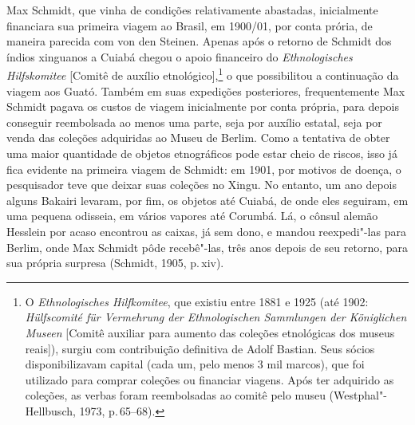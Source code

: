 Max Schmidt, que vinha de condições relativamente abastadas,
inicialmente financiara sua primeira viagem ao Brasil, em 1900/01, por
conta prória, de maneira parecida com von den Steinen. Apenas após o
retorno de Schmidt dos índios xinguanos a Cuiabá chegou o apoio
financeiro do \textit{Ethnologisches Hilfskomitee} {[}Comitê de auxílio
etnológico{]},\footnote{O \textit{Ethnologisches Hilfkomitee}, que existiu
  entre 1881 e 1925 (até 1902: \textit{Hülfscomité für Vermehrung der
  Ethnologischen Sammlungen der Königlichen Museen} {[}Comitê auxiliar
  para aumento das coleções etnológicas dos museus reais{]}), surgiu
  com contribuição definitiva de Adolf Bastian. Seus sócios
  disponibilizavam capital (cada um, pelo menos 3 mil marcos), que foi
  utilizado para comprar coleções ou financiar viagens. Após ter
  adquirido as coleções, as verbas foram reembolsadas ao comitê pelo
  museu (Westphal"-Hellbusch, 1973, p.\,65--68).} o que possibilitou a
continuação da viagem aos Guató. Também em suas expedições posteriores,
frequentemente Max Schmidt pagava os custos de viagem inicialmente por
conta própria, para depois conseguir reembolsada ao menos uma parte,
seja por auxílio estatal, seja por venda das coleções adquiridas ao
Museu de Berlim. Como a tentativa de obter uma maior quantidade de
objetos etnográficos pode estar cheio de riscos, isso já fica evidente
na primeira viagem de Schmidt: em 1901, por motivos de doença, o
pesquisador teve que deixar suas coleções no Xingu. No entanto, um ano
depois alguns Bakairi levaram, por fim, os objetos até Cuiabá, de onde
eles seguiram, em uma pequena odisseia, em vários vapores até Corumbá.
Lá, o cônsul alemão Hesslein por acaso encontrou as caixas, já sem dono,
e mandou reexpedi"-las para Berlim, onde Max Schmidt pôde recebê"-las,
três anos depois de seu retorno, para sua própria surpresa (Schmidt,
1905, p.\,xiv).

